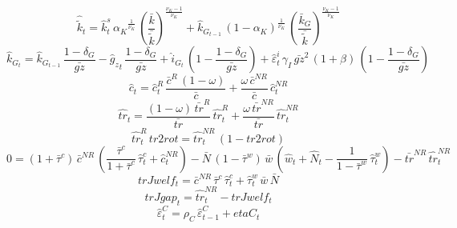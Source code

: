 \begin{dmath}
{\hat{\tilde{k}}_{t}}={\hat{k}^s_{t}}\, {\alpha_K}^{\frac{1}{{\nu_K}}}\, \left(\frac{{\bar{k}}}{{\bar{\tilde{k}}}}\right)^{\frac{{\nu_K}-1}{{\nu_K}}}+{\hat{k}_G_{t-1}}\, \left(1-{\alpha_K}\right)^{\frac{1}{{\nu_K}}}\, \left(\frac{{\bar{k}_G}}{{\bar{\tilde{k}}}}\right)^{\frac{{\nu_K}-1}{{\nu_K}}}
\end{dmath}
\begin{dmath}
{\hat{k}_G_{t}}={\hat{k}_G_{t-1}}\, \frac{1-{\delta_G}}{{\bar{gz}}}-{{\hat{g}_z}_{t}}\, \frac{1-{\delta_G}}{{\bar{gz}}}+{\hat{i}_G_{t}}\, \left(1-\frac{1-{\delta_G}}{{\bar{gz}}}\right)+{\hat{\varepsilon}^i_{t}}\, {\gamma_I}\, {\bar{gz}}^{2}\, \left(1+{\beta}\right)\, \left(1-\frac{1-{\delta_G}}{{\bar{gz}}}\right)
\end{dmath}
\begin{dmath}
{\hat{c}_{t}}={\hat{c}^R_{t}}\, \frac{{\bar{c}^R}\, \left(1-{\omega}\right)}{{\bar{c}}}+\frac{{\omega}\, {\bar{c}^{NR}}}{{\bar{c}}}\, {\hat{c}^{NR}_{t}}
\end{dmath}
\begin{dmath}
{\hat{tr}_{t}}=\frac{\left(1-{\omega}\right)\, {\bar{tr}^{R}}}{{\bar{tr}}}\, {\hat{tr}^R_{t}}+\frac{{\omega}\, {\bar{tr}^{NR}}}{{\bar{tr}}}\, {\hat{tr}^{NR}_{t}}
\end{dmath}
\begin{dmath}
{\hat{tr}^R_{t}}\, {tr2rot}={\hat{tr}^{NR}_{t}}\, \left(1-{tr2rot}\right)
\end{dmath}
\begin{dmath}
0=\left(1+{\bar{\tau}^c}\right)\, {\bar{c}^{NR}}\, \left(\frac{{\bar{\tau}^c}}{1+{\bar{\tau}^c}}\, {\hat{\tau}^c_{t}}+{\hat{c}^{NR}_{t}}\right)-{\bar{N}}\, \left(1-{\bar{\tau}^w}\right)\, {\bar{w}}\, \left({\hat{w}_{t}}+{\hat{N}_{t}}-\frac{1}{1-{\bar{\tau}^w}}\, {\hat{\tau}^w_{t}}\right)-{\bar{tr}^{NR}}\, {\hat{tr}^{NR}_{t}}
\end{dmath}
\begin{dmath}
{trJwelf_{t}}={\bar{c}^{NR}}\, {\bar{\tau}^c}\, {\hat{\tau}^c_{t}}+{\hat{\tau}^w_{t}}\, {\bar{w}}\, {\bar{N}}
\end{dmath}
\begin{dmath}
{trJgap_{t}}={\hat{tr}^{NR}_{t}}-{trJwelf_{t}}
\end{dmath}
\begin{dmath}
{\hat{\varepsilon}^C_{t}}={\rho_{C}}\, {\hat{\varepsilon}^C_{t-1}}+{etaC_{t}}
\end{dmath}
